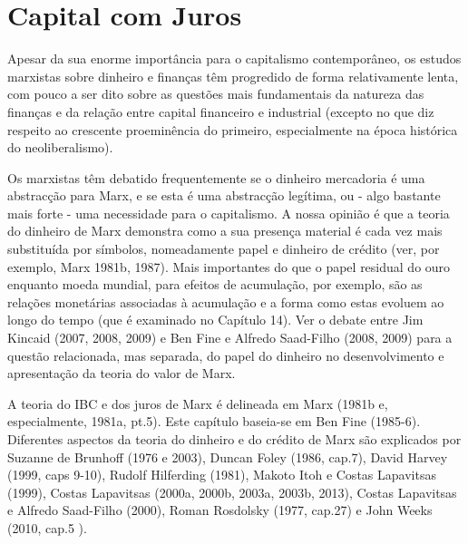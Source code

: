 \section{Capital com Juros}
 \par 
Apesar da sua enorme importância para o capitalismo contemporâneo, os estudos marxistas sobre dinheiro e finanças têm progredido de forma relativamente lenta, com pouco a ser dito sobre as questões mais fundamentais da natureza das finanças e da relação entre capital financeiro e industrial (excepto no que diz respeito ao crescente proeminência do primeiro, especialmente na época histórica do neoliberalismo).
 \par 
Os marxistas têm debatido frequentemente se o dinheiro mercadoria é uma abstracção para Marx, e se esta é uma abstracção legítima, ou - algo bastante mais forte - uma necessidade para o capitalismo. A nossa opinião é que a teoria do dinheiro de Marx demonstra como a sua presença material é cada vez mais substituída por símbolos, nomeadamente papel e dinheiro de crédito (ver, por exemplo, Marx 1981b, 1987). Mais importantes do que o papel residual do ouro enquanto moeda mundial, para efeitos de acumulação, por exemplo, são as relações monetárias associadas à acumulação e a forma como estas evoluem ao longo do tempo (que é examinado no Capítulo {\color{blue}14}). Ver o debate entre Jim Kincaid (2007, 2008, 2009) e Ben Fine e Alfredo Saad-Filho (2008, 2009) para a questão relacionada, mas separada, do papel do dinheiro no desenvolvimento e apresentação da teoria do valor de Marx.
 \par 
A teoria do IBC e dos juros de Marx é delineada em Marx (1981b e, especialmente, 1981a, pt.{\color{blue}5}). Este capítulo baseia-se em Ben Fine (1985-6). Diferentes aspectos da teoria do dinheiro e do crédito de Marx são explicados por Suzanne de Brunhoff (1976 e 2003), Duncan Foley (1986, cap.{\color{blue}7}), David Harvey (1999, caps 9-10), Rudolf Hilferding (1981), Makoto Itoh e Costas Lapavitsas (1999), Costas Lapavitsas (2000a, 2000b, 2003a, 2003b, 2013), Costas Lapavitsas e Alfredo Saad-Filho (2000), Roman Rosdolsky (1977, cap.{\color{blue}27}) e John Weeks (2010, cap.{\color{blue}5} ).